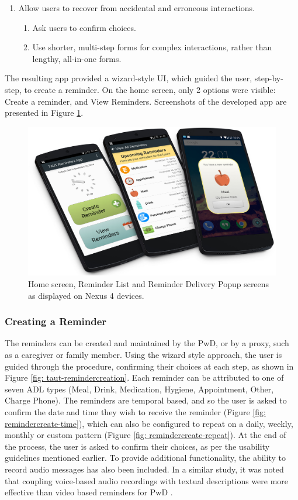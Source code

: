 \begin{enumerate}
 	\item Allow users to recover from accidental and erroneous interactions.
 	\begin{enumerate}
		\item Ask users to confirm choices.
		\item Use shorter, multi-step forms for complex interactions, rather than lengthy, all-in-one forms.
 	\end{enumerate}
\end{enumerate}

The resulting app provided a wizard-style UI, which guided the user, step-by-step, to create a reminder. On the home screen, only 2 options were visible: Create a reminder, and View Reminders. Screenshots of the developed app are presented in Figure \ref{fig: taut-devices}.

\begin{figure}[h]
    \centering
        \includegraphics[scale=0.13, angle=0]{Files/treatment-study-1/figures/device-app-screenshots}
        \caption{Home screen, Reminder List and Reminder Delivery Popup screens as displayed on Nexus 4 devices.}
        \label{fig: taut-devices}
\end{figure}

\subsubsection{Creating a Reminder}
The reminders can be created and maintained by the PwD, or by a proxy, such as a caregiver or family member. Using the wizard style approach, the user is guided through the procedure, confirming their choices at each step, as shown in Figure \ref{fig: taut-remindercreation}. Each reminder can be attributed to one of seven ADL types (Meal, Drink, Medication, Hygiene, Appointment, Other, Charge Phone).
The reminders are temporal based, and so the user is asked to confirm the date and time they wish to receive the reminder (Figure \ref{fig: remindercreate-time}), which can also be configured to repeat on a daily, weekly, monthly or custom pattern (Figure \ref{fig: remindercreate-repeat}). At the end of the process, the user is asked to confirm their choices, as per the usability guidelines mentioned earlier.
To provide additional functionality, the ability to record audio messages has also been included. In a similar study, it was noted that coupling voice-based audio recordings with textual descriptions were more effective than video based reminders for PwD \cite{ONeill2010}.

